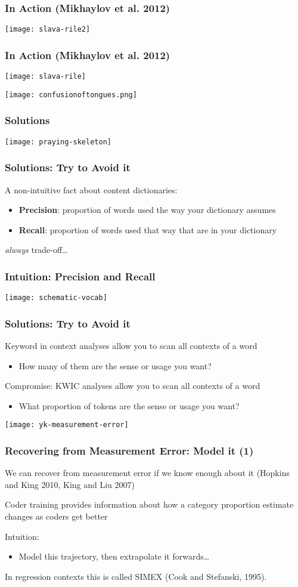 \documentclass[11pt,compress,professionalfonts]{beamer}
\newcommand{\ita}{\begin{itemize}}
\newcommand{\itm}{\item[]}
\newcommand{\itz}{\end{itemize}}
\begin{document}
\begin{frame}[t,fragile]\frametitle{In Action (Mikhaylov et al. 2012)}

\centerline{\texttt{[image: slava-rile2]}}

\end{frame}
\begin{frame}[t,fragile]\frametitle{In Action (Mikhaylov et al. 2012)}

\centerline{\texttt{[image: slava-rile]}}


\newpage
\centerline{\texttt{[image: confusionoftongues.png]}}


\end{frame}
\begin{frame}[t,fragile]\frametitle{Solutions}

\newpage

\centerline{\texttt{[image: praying-skeleton]}}

\end{frame}
\begin{frame}[t,fragile]\frametitle{Solutions: Try to Avoid it}

A non-intuitive fact about content dictionaries:
\ita
\itm \textbf{Precision}: proportion of words used the way your dictionary assumes
\itm \textbf{Recall}: proportion of words used that way that are in your dictionary
\itz
\textit{always} trade-off\ldots

\end{frame}
\begin{frame}[t,fragile]\frametitle{Intuition: Precision and Recall}

\centerline{\texttt{[image: schematic-vocab]}}

\end{frame}
\begin{frame}[t,fragile]\frametitle{Solutions: Try to Avoid it}

Keyword in context analyses allow you to scan all contexts of a word
\ita
\itm How many of them are the sense or usage you want?
\itz

Compromise: KWIC analyses allow you to scan all contexts of a word
\ita
\itm What proportion of tokens are the sense or usage you want?
\itz

\newpage

\centerline{\texttt{[image: yk-measurement-error]}}

\end{frame}
\begin{frame}[t,fragile]\frametitle{Recovering from Measurement Error: Model it (1)}

We can recover from measurement error if we know enough about it (Hopkins and King 2010, King and Liu 2007)

Coder training provides information about how a category proportion estimate changes as coders get better

Intuition:
\ita
\itm Model this trajectory, then extrapolate it forwards\ldots
\itz

In regression contexts this is called SIMEX (Cook and Stefanski, 1995).

\end{frame}
\end{document}
